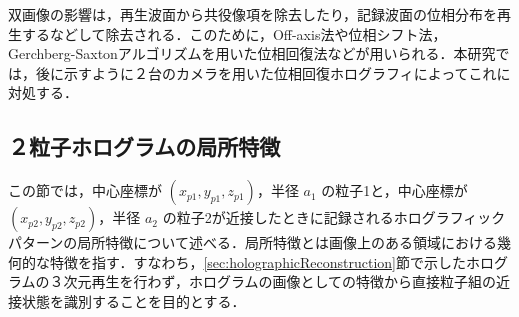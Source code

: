 双画像の影響は，再生波面から共役像項を除去したり，記録波面の位相分布を再生するなどして除去される．このために，Off-axis法\cite{offaxis}や位相シフト法\cite{phaseshift}，Gerchberg-Saxtonアルゴリズムを用いた位相回復法\cite{phaseretrieval}などが用いられる．本研究では，後に示すように２台のカメラを用いた位相回復ホログラフィによってこれに対処する．


\subsection{２粒子ホログラムの局所特徴}\label{sec:twoParticleHologramFeature}
この節では，中心座標が $(x_{p1},y_{p1},z_{p1})$，半径 $a_1$ の粒子1と，中心座標が$(x_{p2},y_{p2},z_{p2})$，半径 $a_2$ の粒子2が近接したときに記録されるホログラフィックパターンの局所特徴について述べる．局所特徴とは画像上のある領域における幾何的な特徴を指す．すなわち，\ref{sec:holographicReconstruction}節で示したホログラムの３次元再生を行わず，ホログラムの画像としての特徴から直接粒子組の近接状態を識別することを目的とする．

